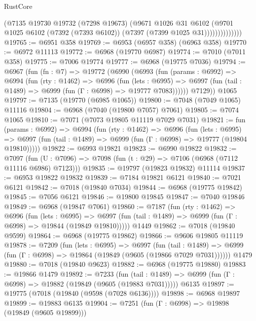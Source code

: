 \begin{lexlean}{RustCore}
\begin{coremodule}
                      (@7135
                        @19730
                        @19732
                        (@7298 @19673)
                        (@9671
                          @1026
                          @31
                          @6102
                          (@9701
                            @1025
                            @6102
                            (@7392 (@7393 @6102))
                            (@7397 (@7399 @1025 @31))))))))))))))
@19765 := @6951 @358
@19769 := @6953 (@6957 @358) (@6963 @358)
@19770 := @6972 @11113
@19772 := @6968 (@19770 @6987)
@19774 := @7010 (@7011 @358)
@19775 := @7006 @19774
@19777 := @6968 (@19775 @7036)
@19794 := @6967
    (fun (fn : @7) =>
    @19772
      (@6990
        (@6993
          (fun (params : @6992) =>
          @6994
            (fun (rty : @1462) =>
            @6996
              (fun (lets : @6995) =>
              @6997 (fun (tail : @1489) => @6999 (fun (Γ : @6998) => @19777 @7083))))))
        @7129))
    @1065
@19797 := @7135 (@19770 (@6985 @1065))
@19800 := @7048 (@7049 @1065) @11116
@19804 := @6968 (@7040 (@19800 @7057) @7061)
@19805 := @7074 @1065
@19810 := @7071 (@7073 @19805 @11119 @7029 @7031)
@19821 := fun (params : @6992) =>
  @6994
    (fun (rty : @1462) =>
    @6996
      (fun (lets : @6995) =>
      @6997 (fun (tail : @1489) => @6999 (fun (Γ : @6998) => @19777 (@19804 @19810)))))
@19822 := @6993 @19821
@19823 := @6990 @19822
@19832 := @7097
    (fun (U : @7096) => @7098 (fun (t : @29) => @7106 (@6968 (@7112 @11116 @6986) @7123)))
@19835 := @19797 (@19823 @19832) @11114
@19837 := @6953 @19822 @19832
@19839 := @7184 @19821 @6121
@19840 := @7021 @6121
@19842 := @7018 (@19840 @7034)
@19844 := @6968 (@19775 @19842)
@19845 := @7056 @6121
@19846 := @19800 @19845
@19847 := @7040 @19846
@19849 := @6968 (@19847 @7061)
@19860 := @7187
    (fun (rty : @1462) =>
    @6996
      (fun (lets : @6995) =>
      @6997 (fun (tail : @1489) => @6999 (fun (Γ : @6998) => @19844 (@19849 @19810)))))
    @1449
@19862 := @7018 (@19840 @9599)
@19864 := @6968 (@19775 @19862)
@19866 := @9606 @19805 @11119
@19878 := @7209
    (fun (lets : @6995) =>
    @6997
      (fun (tail : @1489) =>
      @6999 (fun (Γ : @6998) => @19864 (@19849 (@9605 (@19866 @7029 @7031))))))
    @1479
@19880 := @7018 (@19840 @9623)
@19882 := @6968 (@19775 @19880)
@19883 := @19866 @1479
@19892 := @7233
    (fun (tail : @1489) => @6999 (fun (Γ : @6998) => @19882 (@19849 (@9605 (@19883 @7031)))))
    @6135
@19897 := @19775 (@7018 (@19840 (@9598 (@7028 @6136))))
@19898 := @6968 @19897
@19899 := @19883 @6135
@19904 := @7251 (fun (Γ : @6998) => @19898 (@19849 (@9605 @19899)))

\end{coremodule}
\end{lexlean}
